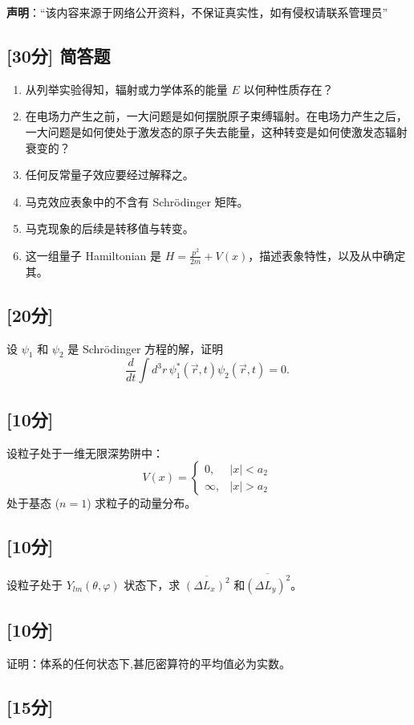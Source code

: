 
\textbf{声明}：“该内容来源于网络公开资料，不保证真实性，如有侵权请联系管理员”

\subsection{[30分] 简答题}
 \begin{enumerate}
        \item 从列举实验得知，辐射或力学体系的能量 $E$ 以何种性质存在？
        \item 在电场力产生之前，一大问题是如何摆脱原子束缚辐射。在电场力产生之后，一大问题是如何使处于激发态的原子失去能量，这种转变是如何使激发态辐射衰变的？
        \item 任何反常量子效应要经过解释之。
        \item 马克效应表象中的不含有 Schrödinger 矩阵。
        \item 马克现象的后续是转移值与转变。
        \item 这一组量子 Hamiltonian 是 $H = \frac{p^2}{2m} + V(x)$，描述表象特性，以及从中确定其。
    \end{enumerate}

\subsection{[20分]}
设 $\psi_1$ 和 $\psi_2$ 是 Schrödinger 方程的解，证明
\[
\frac{d}{dt} \int d^3r \, \psi_1^* (\vec{r}, t) \psi_2 (\vec{r}, t) = 0.~
\]

\subsection{[10分]}
设粒子处于一维无限深势阱中：
\[
V(x) =
\begin{cases}
0, & |x| < a_2 \\
\infty, & |x| > a_2
\end{cases}~
\]
处于基态 ($n=1$) 求粒子的动量分布。

\subsection{[10分]}
设粒子处于 $Y_{lm}(\theta, \varphi)$ 状态下，求 $\overline{(\Delta L_x)^2}$ 和$\overline{(\Delta L_y)^2}$。

\subsection{[10分]}
证明：体系的任何状态下,甚厄密算符的平均值必为实数。

\subsection{[15分]}